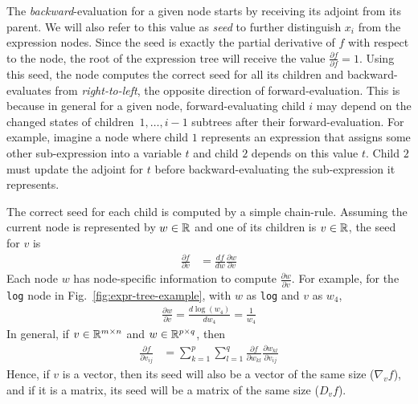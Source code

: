 The \emph{backward}-evaluation for a given node starts by receiving its adjoint from its parent.
We will also refer to this value as \emph{seed} to further distinguish $x_i$ from the expression nodes.
Since the seed is exactly the partial derivative of $f$ with respect to the node,
the root of the expression tree will receive the value $ \frac{\partial f}{\partial f} = 1$.
Using this seed, the node computes the correct seed for all its children and 
backward-evaluates from \emph{right-to-left}, the opposite direction of forward-evaluation.
This is because in general for a given node, forward-evaluating child $i$ may depend
on the changed states of children~$1,\ldots,i-1$ subtrees after their forward-evaluation.
For example, imagine a node where child $1$ represents an expression that 
assigns some other sub-expression into a variable $t$ and child $2$ depends on this value $t$.
Child $ 2$ must update the adjoint for $t$ before backward-evaluating the sub-expression it represents.

The correct seed for each child is computed by a simple chain-rule.
Assuming the current node is represented by $w \in \mathbb{R}$ and one of its children is $v \in \mathbb{R}$,
the seed for $v$ is
\begin{align*}
    \frac{\partial f}{\partial v} &=
        \frac{df}{dw} \frac{\partial w}{\partial v}
\end{align*}
Each node $w$ has node-specific information to compute $\frac{\partial w}{\partial v}$.
For example, for the \verb|log| node in Fig.~\ref{fig:expr-tree-example},
with $w$ as \verb|log| and $v$ as $w_4$,
\begin{align*}
    \frac{\partial w}{\partial v} = \frac{d\log(w_4)}{dw_4} = \frac{1}{w_4}
\end{align*}
In general, if $v \in \mathbb{R}^{m \times n}$ and $w \in \mathbb{R}^{p \times q}$, then
\begin{align*}
    \frac{\partial f}{\partial v_{ij}} &=
        \sum\limits_{k=1}^p \sum\limits_{l=1}^q 
        \frac{\partial f}{\partial w_{kl}} \frac{\partial w_{kl}}{\partial v_{ij}}
\end{align*}
Hence, if $v$ is a vector, then its seed will also be a vector of the same size ($\nabla_v f$),
and if it is a matrix, its seed will be a matrix of the same size ($D_v f$).

